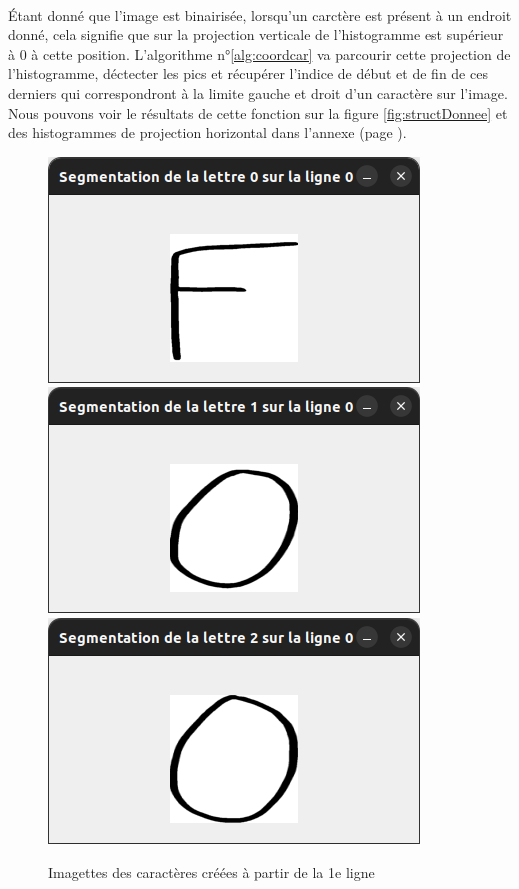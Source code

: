 \documentclass[a4paper]{article}
\begin{document}
			\paragraph{} Étant donné que l'image est binairisée, lorsqu'un carctère est présent à un endroit donné, cela signifie que sur la projection verticale de l'histogramme est supérieur à 0 à cette position. L'algorithme n°\ref{alg:coordcar} va parcourir cette projection de l'histogramme, déctecter les pics et récupérer l'indice de début et de fin de ces derniers qui correspondront à la limite gauche et droit d'un caractère sur l'image. Nous pouvons voir le résultats de cette fonction sur la figure \ref{fig:structDonnee} et des histogrammes de projection horizontal dans l'annexe (page \pageref{fig:histoX1}).
			\begin{figure}
				\caption{Imagettes des caractères créées à partir de la 1e ligne}
				\includegraphics[scale=.3]{segmentation_F.png}
				\centering
				\includegraphics[scale=.3]{segmentation_O1.png}
				\centering
				\includegraphics[scale=.3]{segmentation_O2.png}
				\centering
			\end{figure}
\end{document}
